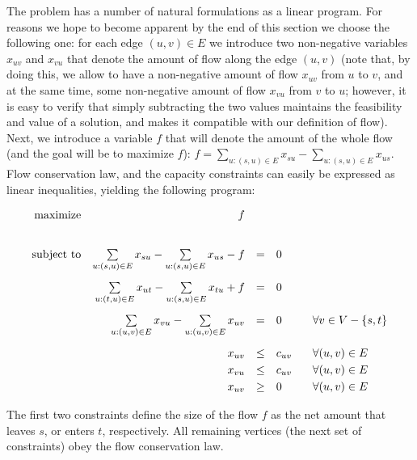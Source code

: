 \noindent
The \maxflow problem has a number of  natural formulations as a linear program. For reasons we hope
to become apparent by the end of this section we choose the following one: for each edge $(u,v)\in E$ 
we introduce two non-negative variables $x_{uv}$ and $x_{vu}$ that denote the amount of flow
along the edge $(u,v)$ (note that, by doing this, we allow to have a non-negative amount of flow $x_{uv}$ from
$u$ to $v$, and at the same time, some non-negative amount of flow $x_{vu}$ from $v$ to $u$; however,
it is easy to verify that simply subtracting the two values maintains the feasibility and value of a solution,
and makes it compatible with our definition of flow).  Next, we introduce a variable $f$ that will
denote the amount of the whole flow (and the goal will be to maximize $f$):
$f=\sum\limits_{u:(s,u)\in E}x_{su}-\sum\limits_{u:(s,u)\in E}x_{us}$. 
Flow conservation law, and the capacity constraints can easily be expressed as linear inequalities, yielding
the following program:

\begin{equation}
  \label{eq:flow:1}
  \begin{array}{rrcll}
      {\rm maximize}     & \multicolumn{1}{r}{f}\\[8mm]
    {\rm subject\ to} & \sum\limits_{u:(s,u)\in E} x_{su} - \sum\limits_{u:(s,u)\in E} x_{us} - f  &=&0&  \\[6mm]
                            & \sum\limits_{u:(t,u)\in E} x_{ut} - \sum\limits_{u:(s,u)\in E} x_{tu} + f  &=&0&  \\[6mm]
                            & \sum\limits_{u:(u,v)\in E} x_{vu} - \sum\limits_{u:(u,v)\in E} x_{uv} &=&0&\;\;\;
    \forall v\in V - \{s,t\}\\[6mm]
    & x_{uv}&\le& c_{uv}&  \;\;\;\forall (u,v)\in E\\[1mm]
    & x_{vu}&\le& c_{uv}&  \;\;\;\forall (u,v)\in E\\[1mm]
                            & x_{uv}&\ge& 0 &  \;\;\;\forall (u,v)\in E\\
  \end{array}
\end{equation}  

\noindent
The first two constraints define the size of the flow $f$ as the net amount that leaves $s$, or enters $t$,
respectively. All remaining vertices (the next set of constraints) obey the flow conservation law. 

